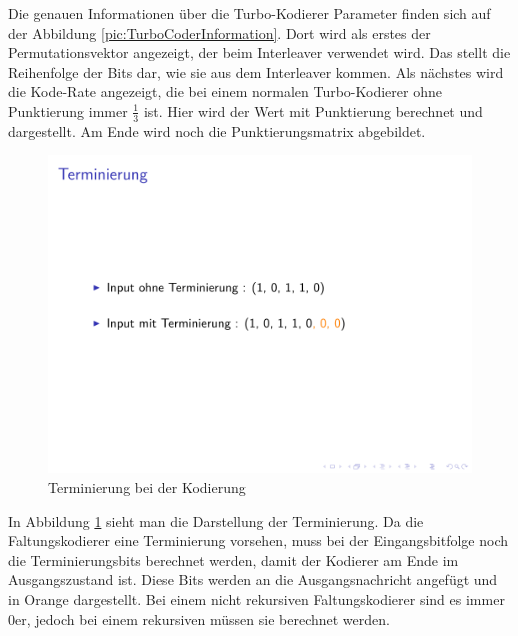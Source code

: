 Die genauen Informationen über die Turbo-Kodierer Parameter finden sich auf der Abbildung \ref{pic:TurboCoderInformation}. Dort wird als erstes der Permutationsvektor angezeigt, der beim Interleaver verwendet wird. Das stellt die Reihenfolge der Bits dar, wie sie aus dem Interleaver kommen. Als nächstes wird die Kode-Rate angezeigt, die bei einem normalen Turbo-Kodierer ohne Punktierung immer $\frac{1}{3}$ ist. Hier wird der Wert mit Punktierung berechnet und dargestellt. Am Ende wird noch die Punktierungsmatrix abgebildet.

\begin{figure}[!ht]
\centering
\includegraphics[width=\ScaleIfNeeded]{pictures/TurboEncodePunctured2}
\caption{Terminierung bei der Kodierung}
\label{pic:TerminationEncode}
\end{figure}  

In Abbildung \ref{pic:TerminationEncode} sieht man die Darstellung der Terminierung. Da die Faltungskodierer eine Terminierung vorsehen, muss bei der Eingangsbitfolge noch die Terminierungsbits berechnet werden, damit der Kodierer am Ende im Ausgangszustand ist. Diese Bits werden an die Ausgangsnachricht angefügt und in Orange dargestellt. Bei einem nicht rekursiven Faltungskodierer sind es immer 0er, jedoch bei einem rekursiven müssen sie berechnet werden.

